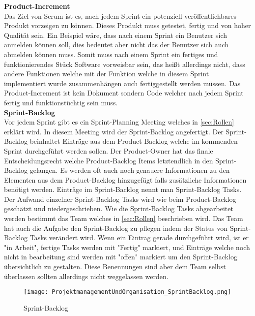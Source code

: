 			\textbf{Product-Increment} \\
			Das Ziel von Scrum ist es, nach jedem Sprint ein potenziell veröffentlichbares Produkt vorzeigen zu können. Dieses Produkt muss getestet, fertig und von hoher Qualität sein. Ein Beispiel wäre, dass nach einem Sprint ein Benutzer sich anmelden können soll, dies bedeutet aber nicht das der Benutzer sich auch abmelden können muss. Somit muss nach einem Sprint ein fertiges und funktionierendes Stück Software vorweisbar sein, das heißt allerdings nicht, dass andere Funktionen welche mit der Funktion welche in diesem Sprint implementiert wurde zusammenhängen auch fertiggestellt werden müssen. Das Product-Increment ist kein Dokument sondern Code welcher nach jedem Sprint fertig und funktionstüchtig sein muss. \textcite{ScrumProduct-Increment}\\

			\textbf{Sprint-Backlog} \\ 
			Vor jedem Sprint gibt es ein Sprint-Planning Meeting welches in \ref{sec:Rollen} erklärt wird. In diesem Meeting wird der Sprint-Backlog angefertigt. Der Sprint-Backlog beinhaltet Einträge aus dem Product-Backlog welche im kommenden Sprint durchgeführt werden sollen. Der Product-Owner hat das finale Entscheidungsrecht welche Product-Backlog Items letztendlich in den Sprint-Backlog gelangen. Es werden oft auch noch genauere Informationen zu den Elementen aus dem Product-Backlog hinzugefügt falls zusätzliche Informationen benötigt werden.
			Einträge im Sprint-Backlog nennt man Sprint-Backlog Tasks. Der Aufwand einzelner Sprint-Backlog Tasks wird wie beim Product-Backlog geschätzt und niedergeschrieben.
			Wie die Sprint-Backlog Tasks abgearbeitet werden bestimmt das Team welches in \ref{sec:Rollen} beschrieben wird. Das Team hat auch die Aufgabe den Sprint-Backlog zu pflegen indem der Status von Sprint-Backlog Tasks verändert wird. Wenn ein Eintrag gerade durchgeführt wird, ist er "in Arbeit", fertige Tasks werden mit "Fertig" markiert, und Einträge welche noch nicht in bearbeitung sind werden mit "offen" markiert um den Sprint-Backlog übersichtlich zu gestalten. Diese Benennungen sind aber dem Team selbst überlassen sollten allerdings nicht weggelassen werden.\textcite{ScrumSprint-Backlog} \\ 
			
\begin{figure}[H]
	\texttt{[image: ProjektmanagementUndOrganisation\_SprintBacklog.png]}
    \caption{Sprint-Backlog}
    \label{fig:sprintBacklog}
\end{figure}
		
